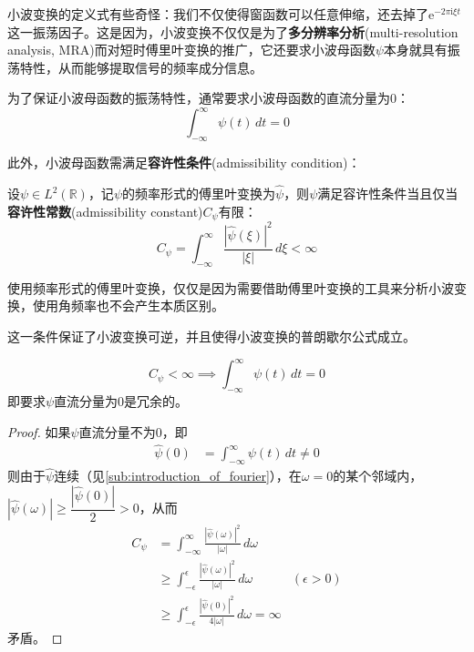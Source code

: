 \documentclass{ctexbook}
\begin{document}
小波变换的定义式有些奇怪：我们不仅使得窗函数可以任意伸缩，还去掉了$\mathrm{e}^{-2\pi \mathrm{i} \xi t}$这一振荡因子。这是因为，小波变换不仅仅是为了\textbf{多分辨率分析}(multi-resolution analysis, MRA)而对短时傅里叶变换的推广，它还要求小波母函数$\psi$本身就具有振荡特性，从而能够提取信号的频率成分信息。

为了保证小波母函数的振荡特性，通常要求小波母函数的直流分量为0\cite{mathematics_in_signal_processing}：
\[\int_{-\infty}^{\infty}\psi(t)\,dt=0\]

此外，小波母函数需满足\textbf{容许性条件}(admissibility condition)：
\begin{definition}[容许性条件]
    设$\psi\in L^2(\mathbb{R})$，记$\psi$的频率形式的傅里叶变换为$\hat{\psi}$，则$\psi$满足容许性条件当且仅当\textbf{容许性常数}(admissibility constant)$C_{\psi}$有限：
    \[C_{\psi}=\int_{-\infty}^{\infty}\frac{|\hat{\psi}(\xi)|^2}{|\xi|}\,d\xi<\infty\]
\end{definition}

使用频率形式的傅里叶变换，仅仅是因为需要借助傅里叶变换的工具来分析小波变换，使用角频率也不会产生本质区别。

这一条件保证了小波变换可逆，并且使得小波变换的普朗歇尔公式成立。

\begin{proposition}
    \[ C_{\psi}<\infty\implies\int_{-\infty}^{\infty}\psi(t)\,dt=0\]
    即要求$\psi$直流分量为0是冗余的。
\end{proposition}
\begin{proof}
    如果$\psi$直流分量不为0，即
    \begin{align*}
    \hat{\psi}(0)&=\int_{-\infty}^{\infty}\psi(t)\,dt\neq 0
    \end{align*}
    则由于$\hat{\psi}$连续（见\ref{sub:introduction_of_fourier}），在$\omega=0$的某个邻域内，$|\hat{\psi}(\omega)|\geq \dfrac{|\hat{\psi}(0)|}{2}>0$，从而
    \begin{align*}
        C_{\psi}&=\int_{-\infty}^{\infty}\frac{|\hat{\psi}(\omega)|^2}{|\omega|}\,d\omega\\
        &\geq \int_{-\epsilon}^{\epsilon}\frac{|\hat{\psi}(\omega)|^2}{|\omega|}\,d\omega&(\epsilon>0)\\
        &\geq \int_{-\epsilon}^{\epsilon}\frac{|\hat{\psi}(0)|^2}{4|\omega|}\,d\omega=\infty
    \end{align*}
    矛盾。
\end{proof}
\end{document}
